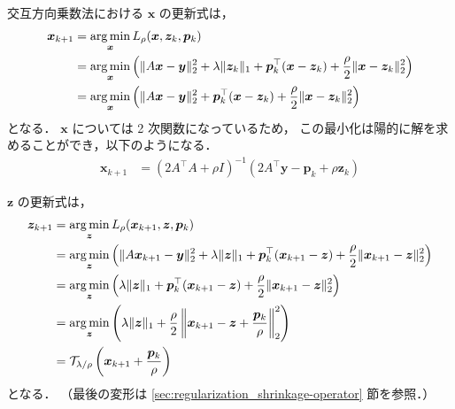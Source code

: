 交互方向乗数法における $\bm{x}$ の更新式は，
\begin{align}
    \bm{x}_{k+1}
     & = \operatorname*{arg \thinspace min}_{\bm{x}} L_{\rho}(\bm{x}, \bm{z}_k, \bm{p}_k)
    \notag                                                                          \\
     & = \operatorname*{arg \thinspace min}_{\bm{x}} \left( \|A \bm{x} - \bm{y}\|_2^2 + \lambda \|\bm{z}_k\|_1
    + \bm{p}_k^\top (\bm{x} - \bm{z}_k)
    + \frac{\rho}{2} \|\bm{x} - \bm{z}_k\|_2^2 \right)
    \notag                                                                          \\
     & = \operatorname*{arg \thinspace min}_{\bm{x}} \left( \|A \bm{x} - \bm{y}\|_2^2
    + \bm{p}_k^\top (\bm{x} - \bm{z}_k)
    + \frac{\rho}{2} \|\bm{x} - \bm{z}_k\|_2^2 \right)
\end{align}
となる．
$\bm{x}$ については 2 次関数になっているため，
この最小化は陽的に解を求めることができ，以下のようになる．
\begin{align}
    \bm{x}_{k+1}
     & = (2 A^\top A + \rho I)^{-1} (2 A^\top \bm{y} - \bm{p}_k + \rho \bm{z}_k)
\end{align}

$\bm{z}$ の更新式は，
\begin{align}
    \bm{z}_{k+1}
     & = \operatorname*{arg \thinspace min}_{\bm{z}} L_{\rho}(\bm{x}_{k+1}, \bm{z}, \bm{p}_k)
    \notag                                                                              \\
     & = \operatorname*{arg \thinspace min}_{\bm{z}} \left( \|A \bm{x}_{k+1} - \bm{y}\|_2^2 + \lambda \|\bm{z}\|_1
    + \bm{p}_k^\top (\bm{x}_{k+1} - \bm{z})
    + \frac{\rho}{2} \|\bm{x}_{k+1} - \bm{z}\|_2^2 \right)
    \notag                                                                              \\
     & = \operatorname*{arg \thinspace min}_{\bm{z}} \left( \lambda \|\bm{z}\|_1
    + \bm{p}_k^\top (\bm{x}_{k+1} - \bm{z})
    + \frac{\rho}{2} \|\bm{x}_{k+1} - \bm{z}\|_2^2 \right)
    \notag                                                                              \\
     & = \operatorname*{arg \thinspace min}_{\bm{z}} \left( \lambda \|\bm{z}\|_1
    + \frac{\rho}{2} \left\|\bm{x}_{k+1} - \bm{z} + \frac{\bm{p}_k}{\rho} \right\|_2^2 \right)
    \notag                                                                              \\
     & = \mathcal{T}_{\lambda/\rho} \left( \bm{x}_{k+1} + \frac{\bm{p}_k}{\rho} \right)
\end{align}
となる．
（最後の変形は \ref{sec:regularization_shrinkage-operator} 節を参照．）

